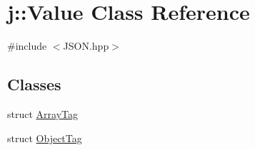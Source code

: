 \hypertarget{classj_1_1_value}{\section{j\-:\-:Value Class Reference}
\label{classj_1_1_value}
}


{\ttfamily \#include $<$J\-S\-O\-N.\-hpp$>$}

\subsection*{Classes}
\begin{DoxyCompactItemize}
\item 
struct \hyperlink{structj_1_1_value_1_1_array_tag}{Array\-Tag}
\item 
struct \hyperlink{structj_1_1_value_1_1_object_tag}{Object\-Tag}
\end{DoxyCompactItemize}
